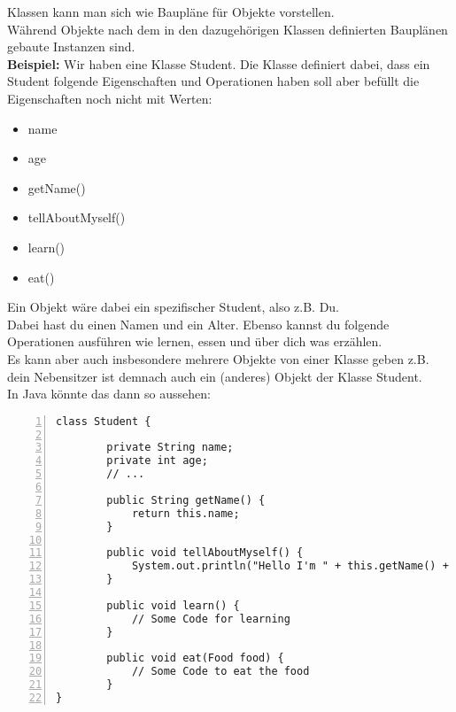 


\begin{Infobox}
    Klassen kann man sich wie Baupläne für Objekte vorstellen.\\
    Während Objekte nach dem in den dazugehörigen Klassen definierten Bauplänen gebaute Instanzen sind.\\

    \textbf{Beispiel:} Wir haben eine Klasse Student.
    Die Klasse definiert dabei, dass ein Student folgende Eigenschaften und Operationen haben soll aber befüllt die Eigenschaften noch nicht mit Werten:

    \begin{itemize}
        \item name
        \item age
        \item getName()
        \item tellAboutMyself()
        \item learn()
        \item eat()
    \end{itemize}

    Ein Objekt wäre dabei ein spezifischer Student, also z.B. Du.\\
    Dabei hast du einen Namen und ein Alter.
    Ebenso kannst du folgende Operationen ausführen wie lernen, essen und über dich was erzählen.\\
    Es kann aber auch insbesondere mehrere Objekte von einer Klasse geben z.B. dein Nebensitzer ist demnach auch ein (anderes) Objekt der Klasse Student.\\
    In Java könnte das dann so aussehen:

    \begin{lstlisting}[numbers=left,xleftmargin=2em,frame=single,framexleftmargin=1.5em]
class Student {

        private String name;
        private int age;
        // ...

        public String getName() {
            return this.name;
        }

        public void tellAboutMyself() {
            System.out.println("Hello I'm " + this.getName() + ". I'm " + age + " old!";
        }

        public void learn() {
            // Some Code for learning
        }

        public void eat(Food food) {
            // Some Code to eat the food
        }
}

    \end{lstlisting}
\end{Infobox}

